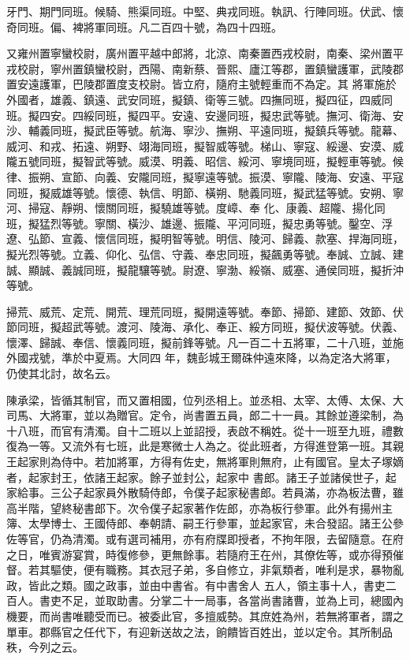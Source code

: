 \begin{pinyinscope}
 牙門、期門同班。候騎、熊渠同班。中堅、典戎同班。執訊、行陣同班。伏武、懷奇同班。偏、裨將軍同班。凡二百四十號，為四十四班。



 又雍州置寧蠻校尉，廣州置平越中郎將，北涼、南秦置西戎校尉，南秦、梁州置平戎校尉，寧州置鎮蠻校尉，西陽、南新蔡、晉熙、廬江等郡，置鎮蠻護軍，武陵郡置安遠護軍，巴陵郡置度支校尉。皆立府，隨府主號輕重而不為定。其
 將軍施於外國者，雄義、鎮遠、武安同班，擬鎮、衛等三號。四撫同班，擬四征，四威同班。擬四安。四綏同班，擬四平。安遠、安邊同班，擬忠武等號。撫河、衛海、安沙、輔義同班，擬武臣等號。航海、寧沙、撫朔、平遠同班，擬鎮兵等號。龍幕、威河、和戎、拓遠、朔野、翊海同班，擬智威等號。梯山、寧寇、綏邊、安漠、威隴五號同班，擬智武等號。威漠、明義、昭信、綏河、寧境同班，擬輕車等號。候律、振朔、宣節、向義、安隴同班，擬寧遠等號。振漠、寧隴、陵海、安遠、平寇同班，擬威雄等號。懷德、執信、明節、橫朔、馳義同班，擬武猛等號。安朔、寧河、掃寇、靜朔、懷關同班，擬驍雄等號。度嶂、奉
 化、康義、超隴、揚化同班，擬猛烈等號。寧關、橫沙、雄邊、振隴、平河同班，擬忠勇等號。鑿空、浮遼、弘節、宣義、懷信同班，擬明智等號。明信、陵河、歸義、款塞、捍海同班，擬光烈等號。立義、仰化、弘信、守義、奉忠同班，擬飆勇等號。奉誠、立誠、建誠、顯誠、義誠同班，擬龍驤等號。尉遼、寧渤、綏嶺、威塞、通侯同班，擬折沖等號。



 掃荒、威荒、定荒、開荒、理荒同班，擬開遠等號。奉節、掃節、建節、效節、伏節同班，擬超武等號。渡河、陵海、承化、奉正、綏方同班，擬伏波等號。伏義、懷澤、歸誠、奉信、懷義同班，擬前鋒等號。凡一百二十五將軍，二十八班，並施外國戎號，準於中夏焉。大同四
 年，魏彭城王爾硃仲遠來降，以為定洛大將軍，仍使其北討，故名云。



 陳承梁，皆循其制官，而又置相國，位列丞相上。並丞相、太宰、太傅、太保、大司馬、大將軍，並以為贈官。定令，尚書置五員，郎二十一員。其餘並遵梁制，為十八班，而官有清濁。自十二班以上並詔授，表啟不稱姓。從十一班至九班，禮數復為一等。又流外有七班，此是寒微士人為之。從此班者，方得進登第一班。其親王起家則為侍中。若加將軍，方得有佐史，無將軍則無府，止有國官。皇太子塚嫡者，起家封王，依諸王起家。餘子並封公，起家中
 書郎。諸王子並諸侯世子，起家給事。三公子起家員外散騎侍郎，令僕子起家秘書郎。若員滿，亦為板法曹，雖高半階，望終秘書郎下。次令僕子起家著作佐郎，亦為板行參軍。此外有揚州主簿、太學博士、王國侍郎、奉朝請、嗣王行參軍，並起家官，未合發詔。諸王公參佐等官，仍為清濁。或有選司補用，亦有府牒即授者，不拘年限，去留隨意。在府之日，唯賓游宴賞，時復修參，更無餘事。若隨府王在州，其僚佐等，或亦得預催督。若其驅使，便有職務。其衣冠子弟，多自修立，非氣類者，唯利是求，暴物亂政，皆此之類。國之政事，並由中書省。有中書舍人
 五人，領主事十人，書吏二百人。書吏不足，並取助書。分掌二十一局事，各當尚書諸曹，並為上司，總國內機要，而尚書唯聽受而已。被委此官，多擅威勢。其庶姓為州，若無將軍者，謂之單車。郡縣官之任代下，有迎新送故之法，餉饋皆百姓出，並以定令。其所制品秩，今列之云。




\end{pinyinscope}
